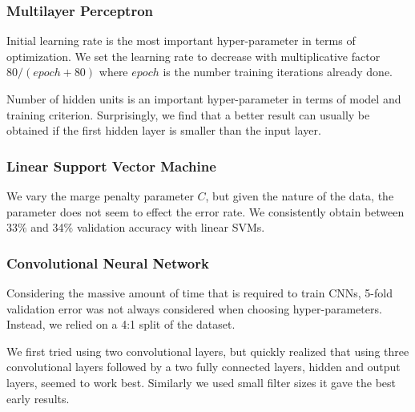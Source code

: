 \documentclass{acm_proc_article-sp}
\begin{document}
\subsubsection{Multilayer Perceptron}
Initial learning rate is the most important hyper-parameter in terms of optimization. We set the learning rate to decrease with multiplicative factor $80/(epoch+80)$ where $epoch$ is the number training iterations already done. 

Number of hidden units is an important hyper-parameter in terms of model and training criterion. Surprisingly, we find that a better result can usually be obtained if the first hidden layer is smaller than the input layer.

\subsubsection{Linear Support Vector Machine }
We vary the marge penalty parameter $C$, but given the nature of the data, the parameter does not seem to effect the error rate. We consistently obtain between 33$\%$ and 34$\%$ validation accuracy with linear SVMs.

\subsubsection{Convolutional Neural Network}
Considering the massive amount of time that is required to train CNNs, 5-fold validation error was not always considered when choosing hyper-parameters. Instead, we relied on a 4:1 split of the dataset. 

We first tried using two convolutional layers, but quickly realized that using three convolutional layers followed by a two fully connected layers, hidden and output layers, seemed to work best. Similarly we used small filter sizes it gave the best early results. 
\end{document}

